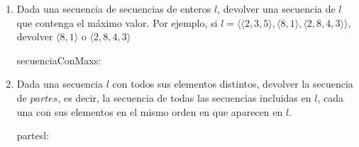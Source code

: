 \begin{enumerate}[label=\alph*)]
            \begin{proc}{elQueMasDivide}{\In s: \TLista{\ent}}{\ent}


            \end{proc}

      \item Dada una secuencia de secuencias de enteros $l$, devolver una secuencia de $l$ que contenga el máximo valor. Por ejemplo, si $l = \langle \langle 2, 3, 5 \rangle, \langle 8, 1 \rangle, \langle 2, 8, 4, 3 \rangle \rangle$, devolver $\langle 8, 1 \rangle$ o $\langle 2, 8, 4, 3 \rangle$

            \begin{proc}{secuenciaConMax}{\In s: \TLista{\TLista{\ent}}}{\TLista{\ent}}
            \end{proc}

      \item Dada una secuencia $l$ con todos sus elementos distintos, devolver la secuencia de $partes$, es decir, la secuencia de todas las secuencias incluidas en $l$, cada una con sus elementos en el mismo orden en que aparecen en $l$.

            \begin{proc}{partes}{\In l: \TLista{\ent}}{\TLista{\TLista{\ent}}}
                  \asegura{} \hacer


            \end{proc}
\end{enumerate}

